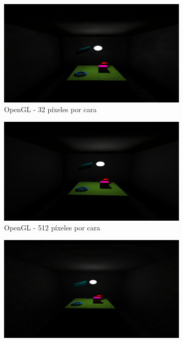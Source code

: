\begin{figure}[H]
	\centering
	\begin{subfigure}{0.45\textwidth}
		\includegraphics[width=1\linewidth]{assets/32sgl}
		\caption{OpenGL - 32 píxeles por cara}
	\end{subfigure}
	\begin{subfigure}{0.45\textwidth}
		\includegraphics[width=1\linewidth]{assets/512sgl}
		\caption{OpenGL - 512 píxeles por cara}
	\end{subfigure}
	\begin{subfigure}{0.45\textwidth}
		\includegraphics[width=1\linewidth]{assets/32srt}

\end{subfigure}
\end{figure}
